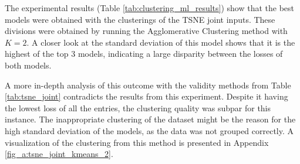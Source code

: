 The experimental results (Table \ref{tab:clustering_ml_results}) show that the best models were obtained with the clusterings of the TSNE joint inputs. These divisions were obtained by running the Agglomerative Clustering method with $K=2$. A closer look at the standard deviation of this model shows that it is the highest of the top 3 models, indicating a large disparity between the losses of both models. 


A more in-depth analysis of this outcome with the validity methods from Table \ref{tab:tsne_joint} contradicts the results from this experiment. Despite it having the lowest loss of all the entries, the clustering quality was subpar for this instance. The inappropriate clustering of the dataset might be the reason for the high standard deviation of the models, as the data was not grouped correctly. A visualization of the clustering from this method is presented in Appendix \ref{fig_a:tsne_joint_kmeans_2}.



